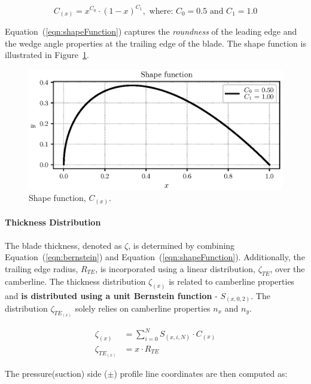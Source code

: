 \begin{equation}
  C_{(x)} = x^{C_0} \cdot (1 - x)^{C_1}, \text{ where: } C_0 = 0.5 \text{ and } C_1 = 1.0
  \label{eqn:shapeFunction}
\end{equation}

Equation~(\ref{eqn:shapeFunction}) captures the \textit{roundness} of the leading edge and the wedge angle properties at the trailing edge of the blade. The shape function is illustrated in Figure~\ref{fig:shapeFunction}.

\begin{figure}[!h]
  \centering
  \includegraphics[scale=0.8]{pyFigure/figures/class.eps}
  \caption{Shape function, $C_{(x)}$.}
  \label{fig:shapeFunction}
\end{figure}

\paragraph{Thickness Distribution}

The blade thickness, denoted as $\zeta$, is determined by combining Equation~(\ref{eqn:bernstein}) and Equation~(\ref{eqn:shapeFunction}). Additionally, the trailing edge radius, $R_{TE}$, is incorporated using a linear distribution, $\zeta_{TE}$, over the camberline. The thickness distribution $\zeta_{(x)}$ is related to camberline properties and \textbf{is distributed using a unit Bernstein function} - $S_{(x, 0, 2)}$. The distribution $\zeta_{TE_{(x)}}$ solely relies on camberline properties $n_x$ and $n_y$.

\begin{align}
  \zeta_{(x)}       & = \sum_{i = 0}^N S_{(x, i, N)} \cdot C_{(x)} \\
  \zeta_{TE_{(x)}}  & = x \cdot R_{TE} 
\end{align}

The pressure(suction) side ($\pm$) profile line coordinates are then computed as: 

